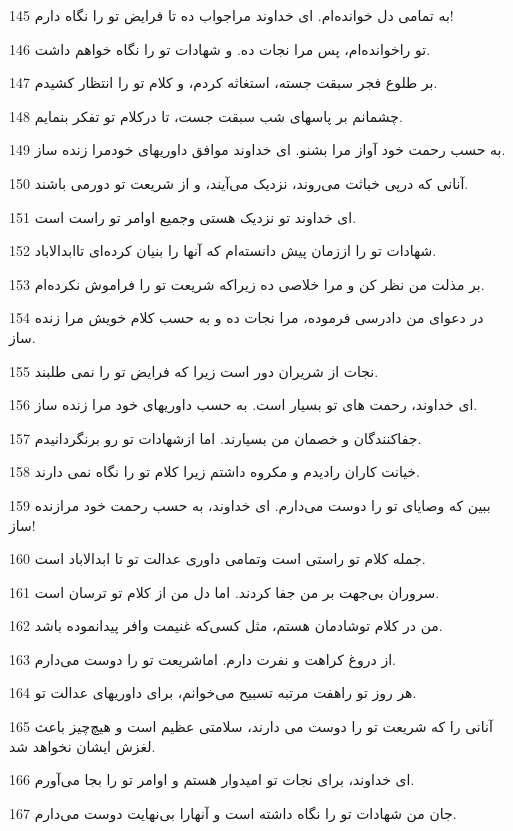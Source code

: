 \par 145 به تمامی دل خوانده‌ام. ای خداوند مراجواب ده تا فرایض تو را نگاه دارم!
\par 146 تو راخوانده‌ام، پس مرا نجات ده. و شهادات تو را نگاه خواهم داشت.
\par 147 بر طلوع فجر سبقت جسته، استغاثه کردم، و کلام تو را انتظار کشیدم.
\par 148 چشمانم بر پاسهای شب سبقت جست، تا درکلام تو تفکر بنمایم.
\par 149 به حسب رحمت خود آواز مرا بشنو. ای خداوند موافق داوریهای خودمرا زنده ساز.
\par 150 آنانی که در‌پی خباثت می‌روند، نزدیک می‌آیند، و از شریعت تو دورمی باشند.
\par 151 ‌ای خداوند تو نزدیک هستی وجمیع اوامر تو راست است.
\par 152 شهادات تو را اززمان پیش دانسته‌ام که آنها را بنیان کرده‌ای تاابدالاباد.
\par 153 بر مذلت من نظر کن و مرا خلاصی ده زیراکه شریعت تو را فراموش نکرده‌ام.
\par 154 در دعوای من دادرسی فرموده، مرا نجات ده و به حسب کلام خویش مرا زنده ساز.
\par 155 نجات از شریران دور است زیرا که فرایض تو را نمی طلبند.
\par 156 ‌ای خداوند، رحمت های تو بسیار است. به حسب داوریهای خود مرا زنده ساز.
\par 157 جفاکنندگان و خصمان من بسیارند. اما ازشهادات تو رو برنگردانیدم.
\par 158 خیانت کاران رادیدم و مکروه داشتم زیرا کلام تو را نگاه نمی دارند.
\par 159 ببین که وصایای تو را دوست می‌دارم. ای خداوند، به حسب رحمت خود مرازنده ساز!
\par 160 جمله کلام تو راستی است وتمامی داوری عدالت تو تا ابدالاباد است.
\par 161 سروران بی‌جهت بر من جفا کردند. اما دل من از کلام تو ترسان است.
\par 162 من در کلام توشادمان هستم، مثل کسی‌که غنیمت وافر پیدانموده باشد.
\par 163 از دروغ کراهت و نفرت دارم. اماشریعت تو را دوست می‌دارم.
\par 164 هر روز تو راهفت مرتبه تسبیح می‌خوانم، برای داوریهای عدالت تو.
\par 165 آنانی را که شریعت تو را دوست می دارند، سلامتی عظیم است و هیچ‌چیز باعث لغزش ایشان نخواهد شد.
\par 166 ‌ای خداوند، برای نجات تو امیدوار هستم و اوامر تو را بجا می‌آورم.
\par 167 جان من شهادات تو را نگاه داشته است و آنهارا بی‌نهایت دوست می‌دارم.
